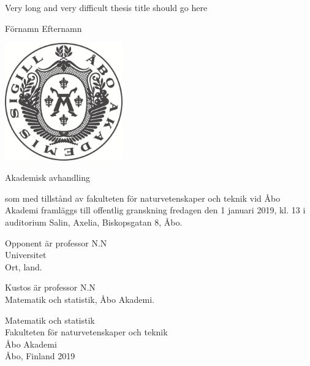 \documentclass[10pt, b5paper]{memoir}
\begin{document}
\thispagestyle{empty}

\begin{center}
   \Huge

	\vfill
	\vfill

    \noindent Very long and very difficult thesis title should go here
	
	\vfill

   \LARGE
   \vspace{1cm}
   \noindent Förnamn Efternamn

	\vfill
	\vspace{1cm}
	
	\includegraphics[width=0.38\textwidth]{../sigill.png}
	
	\vfill
	\vspace{3mm}

	\noindent Akademisk avhandling
	\vspace{3mm}
	\Large
	
	
		
	som med tillst\aa nd av fakulteten f\"or naturvetenskaper och teknik vid \AA bo Akademi framl\"aggs till offentlig granskning fredagen den 1 januari 2019, kl. 13 i auditorium Salin, Axelia, Biskopsgatan 8, \AA bo.

	
	\vfill
	\vfill
  
	
	
	Opponent \"ar professor N.N\\
	Universitet\\
    Ort, land.\\


\vfill

	Kustos \"ar professor N.N\\
	Matematik och statistik, \AA bo Akademi.
	
\vfill
	\vspace{3mm}
	
	
	\large
	\noindent
	Matematik och statistik\\
	Fakulteten f\"or naturvetenskaper och teknik\\
	\AA bo Akademi\\
	\AA bo, Finland 2019

\end{center}
\end{document}
